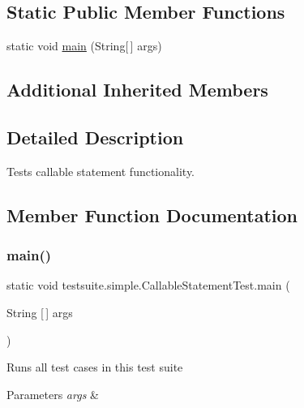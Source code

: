 \subsection*{Static Public Member Functions}
\begin{DoxyCompactItemize}
\item 
static void \mbox{\hyperlink{classtestsuite_1_1simple_1_1_callable_statement_test_a719a94d42424a377d55c18fd915bb356}{main}} (String\mbox{[}$\,$\mbox{]} args)
\end{DoxyCompactItemize}
\subsection*{Additional Inherited Members}


\subsection{Detailed Description}
Tests callable statement functionality. 

\subsection{Member Function Documentation}
\mbox{\label{classtestsuite_1_1simple_1_1_callable_statement_test_a719a94d42424a377d55c18fd915bb356}} 
\subsubsection{\texorpdfstring{main()}{main()}}
{\footnotesize\ttfamily static void testsuite.\+simple.\+Callable\+Statement\+Test.\+main (\begin{DoxyParamCaption}\item[{String \mbox{[}$\,$\mbox{]}}]{args }\end{DoxyParamCaption})\hspace{0.3cm}{\ttfamily [static]}}

Runs all test cases in this test suite


\begin{DoxyParams}{Parameters}
{\em args} & \\
\hline
\end{DoxyParams}
\mbox{\label{classtestsuite_1_1simple_1_1_callable_statement_test_aff9447e7125f78c20b0eab4c5646b013}} 
